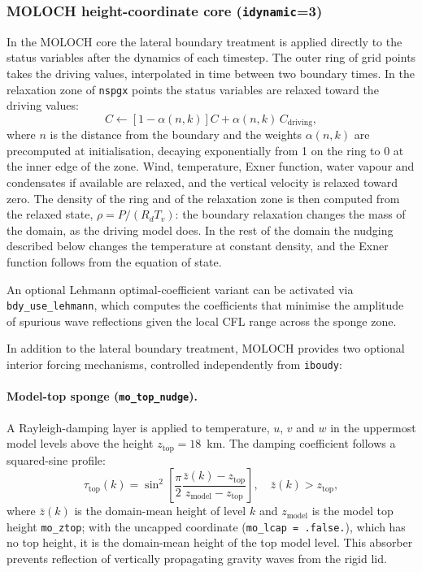 {\begin{enumerate}
\end{enumerate}

\subsubsection{MOLOCH height-coordinate core (\texttt{idynamic}=3)}

In the MOLOCH core the lateral boundary treatment is applied directly
to the status variables after the dynamics of each timestep. The outer ring
of grid points takes the driving values, interpolated in time between two
boundary times. In the relaxation zone of \texttt{nspgx} points the status
variables are relaxed toward the driving values:
\begin{equation}
  C \leftarrow \left[1 - \alpha(n,k)\right] C + \alpha(n,k)\,C_\mathrm{driving},
\end{equation}
where $n$ is the distance from the boundary and the weights $\alpha(n,k)$ are
precomputed at initialisation, decaying exponentially from 1 on the ring to 0
at the inner edge of the zone. Wind, temperature, Exner function, water
vapour and condensates if available are relaxed, and the vertical velocity is
relaxed toward zero. The density of the ring and of the relaxation zone is then
computed from the relaxed state, $\rho = P/(R_d T_v)$: the boundary relaxation
changes the mass of the domain, as the driving model does. In the rest of the
domain the nudging described below changes the temperature at constant
density, and the Exner function follows from the equation of state.

An optional Lehmann optimal-coefficient variant \citep{Vannitsem_05} can be
activated via \texttt{bdy\_use\_lehmann}, which computes the coefficients
that minimise the amplitude of spurious wave reflections given the local
CFL range across the sponge zone.

In addition to the lateral boundary treatment, MOLOCH provides two optional
interior forcing mechanisms, controlled independently from \texttt{iboudy}:

\paragraph{Model-top sponge (\texttt{mo\_top\_nudge}).}
A Rayleigh-damping layer is applied to temperature, $u$, $v$ and $w$ in the
uppermost model levels above the height $z_\mathrm{top}=18$~km.
The damping coefficient follows a squared-sine profile:
\begin{equation}
  \tau_\mathrm{top}(k) = \sin^2\!\left[
    \frac{\pi}{2}\frac{\bar{z}(k) - z_\mathrm{top}}{z_\mathrm{model} - z_\mathrm{top}}
  \right], \quad \bar{z}(k) > z_\mathrm{top},
\end{equation}
where $\bar{z}(k)$ is the domain-mean height of level $k$ and
$z_\mathrm{model}$ is the model top height \texttt{mo\_ztop}; with the
uncapped coordinate (\texttt{mo\_lcap = .false.}), which has no top height,
it is the domain-mean height of the top model level. This absorber prevents reflection of vertically
propagating gravity waves from the rigid lid.

}
